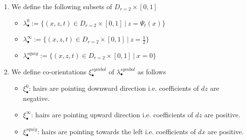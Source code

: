 \begin{definition}
\begin{enumerate}
\item We define the following subsets of $D_{r=2}\times [0,1]$
\begin{itemize}
\item $\lambda_\bullet^0 := \{(x,z,t) \in D_{r=2} \times [0,1] ~|~ z = \Psi_t(x)\}$

\item $\lambda_\bullet^\infty:=\{(x,z,t) \in D_{r=2}\times [0,1] ~|~ z = \frac{1}{2}\}$

\item $\lambda_\bullet^{squig} := \{(x,z,t) \in D_{r=2}\times [0,1] ~|~ x=0 \}$
\end{itemize}

\item We define co-orientations $\xi_\bullet^{symbol}$ of $\lambda_\bullet^{symbol}$ as follows
\begin{itemize}
\item $\xi_\bullet^0$: hairs are pointing downward direction i.e. coefficients of $dz$ are negative.

\item $\xi_\bullet^\infty$: hairs are pointing upward direction i.e. coefficients of $dz$ are positive.

\item $\xi_\bullet^{squig}$: hairs are pointing towards the left i.e. coefficients of $dx$ are positive.
\end{itemize}
\end{enumerate}
\end{definition}

